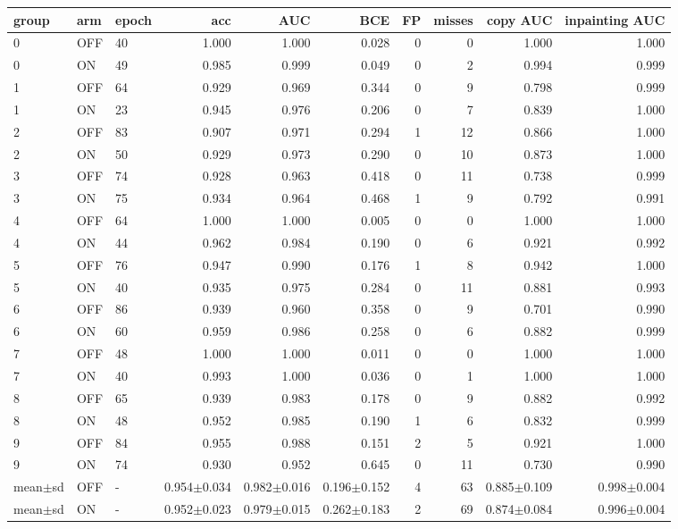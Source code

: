 \begin{tabular}{lllrrrrrrr}
\toprule
group & arm & epoch & acc & AUC & BCE & FP & misses & copy AUC & inpainting AUC \\
\midrule
0 & OFF & 40 & 1.000 & 1.000 & 0.028 & 0 & 0 & 1.000 & 1.000 \\
0 & ON & 49 & 0.985 & 0.999 & 0.049 & 0 & 2 & 0.994 & 0.999 \\
1 & OFF & 64 & 0.929 & 0.969 & 0.344 & 0 & 9 & 0.798 & 0.999 \\
1 & ON & 23 & 0.945 & 0.976 & 0.206 & 0 & 7 & 0.839 & 1.000 \\
2 & OFF & 83 & 0.907 & 0.971 & 0.294 & 1 & 12 & 0.866 & 1.000 \\
2 & ON & 50 & 0.929 & 0.973 & 0.290 & 0 & 10 & 0.873 & 1.000 \\
3 & OFF & 74 & 0.928 & 0.963 & 0.418 & 0 & 11 & 0.738 & 0.999 \\
3 & ON & 75 & 0.934 & 0.964 & 0.468 & 1 & 9 & 0.792 & 0.991 \\
4 & OFF & 64 & 1.000 & 1.000 & 0.005 & 0 & 0 & 1.000 & 1.000 \\
4 & ON & 44 & 0.962 & 0.984 & 0.190 & 0 & 6 & 0.921 & 0.992 \\
5 & OFF & 76 & 0.947 & 0.990 & 0.176 & 1 & 8 & 0.942 & 1.000 \\
5 & ON & 40 & 0.935 & 0.975 & 0.284 & 0 & 11 & 0.881 & 0.993 \\
6 & OFF & 86 & 0.939 & 0.960 & 0.358 & 0 & 9 & 0.701 & 0.990 \\
6 & ON & 60 & 0.959 & 0.986 & 0.258 & 0 & 6 & 0.882 & 0.999 \\
7 & OFF & 48 & 1.000 & 1.000 & 0.011 & 0 & 0 & 1.000 & 1.000 \\
7 & ON & 40 & 0.993 & 1.000 & 0.036 & 0 & 1 & 1.000 & 1.000 \\
8 & OFF & 65 & 0.939 & 0.983 & 0.178 & 0 & 9 & 0.882 & 0.992 \\
8 & ON & 48 & 0.952 & 0.985 & 0.190 & 1 & 6 & 0.832 & 0.999 \\
9 & OFF & 84 & 0.955 & 0.988 & 0.151 & 2 & 5 & 0.921 & 1.000 \\
9 & ON & 74 & 0.930 & 0.952 & 0.645 & 0 & 11 & 0.730 & 0.990 \\
mean$\pm$sd & OFF & - & 0.954$\pm$0.034 & 0.982$\pm$0.016 & 0.196$\pm$0.152 & 4 & 63 & 0.885$\pm$0.109 & 0.998$\pm$0.004 \\
mean$\pm$sd & ON & - & 0.952$\pm$0.023 & 0.979$\pm$0.015 & 0.262$\pm$0.183 & 2 & 69 & 0.874$\pm$0.084 & 0.996$\pm$0.004 \\
\bottomrule
\end{tabular}

